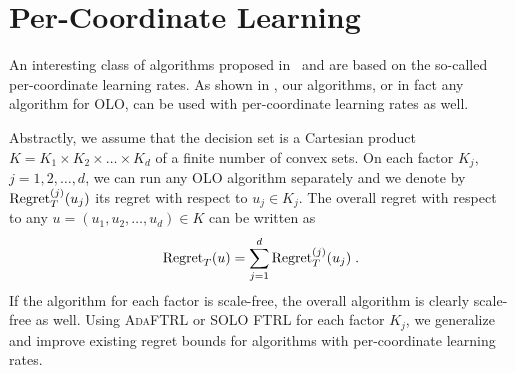 \section{Per-Coordinate Learning}

An interesting class of algorithms proposed in~\cite{McMahan-Streeter-2010} and
\cite{Duchi-Hazan-Singer-2011} are based on the so-called per-coordinate
learning rates.  As shown in \cite{Streeter-McMahan-2010}, our algorithms, or
in fact any algorithm for OLO, can be used with per-coordinate learning rates
as well.

Abstractly, we assume that the decision set is a Cartesian product $K=K_1
\times K_2 \times \dots \times K_d$ of a finite number of convex sets.  On each
factor $K_j$, $j=1,2,\dots,d$, we can run any OLO algorithm separately and we
denote by $\operatorname{Regret}_T^{(j)}(u_j)$ its regret with respect to $u_j \in K_j$. The
overall regret with respect to any $u=(u_1, u_2, \dots, u_d) \in K$ can be
written as
$$
\operatorname{Regret}_T(u) = \sum_{j=1}^d \operatorname{Regret}_T^{(j)}(u_j) \; .
$$
If the algorithm for each factor is scale-free, the overall algorithm is
clearly scale-free as well.  Using \textsc{AdaFTRL} or \textsc{SOLO FTRL} for
each factor $K_j$, we generalize and improve existing regret bounds
\cite{McMahan-Streeter-2010,Duchi-Hazan-Singer-2011} for algorithms with
per-coordinate learning rates.
